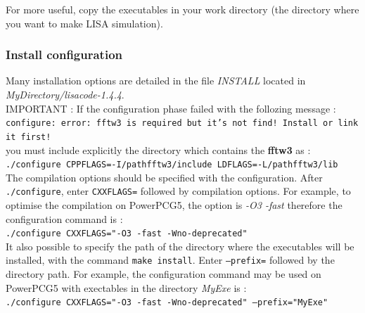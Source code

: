 \documentclass[a4paper,english,12pt]{article}
\begin{document}
For more useful, copy the executables in your work directory (the directory where you want to make LISA simulation).


\subsubsection{Install configuration}
\label{SSSInstallConfig}
Many installation options are detailed in the file {\it INSTALL} located in {\it MyDirectory/lisacode-1.4.4}.\\

IMPORTANT : If the configuration phase failed with the follozing message : \\
{\tt configure: error: fftw3 is required but it's not find! Install or link it first!} \\
you must include explicitly the directory which contains the {\bf fftw3} as : \\
 {\tt ./configure CPPFLAGS=-I/pathfftw3/include LDFLAGS=-L/pathfftw3/lib} \\

The compilation options should be specified with the configuration. After \texttt{./configure}, enter \texttt{CXXFLAGS=} followed by compilation options. For example, to optimise the compilation on PowerPCG5, the option is {\it -O3 -fast} therefore the configuration command is : \\
\hphantom{aaaaa}\texttt{./configure CXXFLAGS="-O3 -fast -Wno-deprecated"} \\ 

It also possible to specify the path of the directory where the executables will be installed, with the command \texttt{make install}. Enter \texttt{--prefix=} followed by the directory path. For example, the configuration command may be used on PowerPCG5 with exectables in the directory {\it MyExe} is : \\
\hphantom{aaaaa}\texttt{./configure CXXFLAGS="-O3 -fast -Wno-deprecated" --prefix="MyExe"} \\
\end{document}
